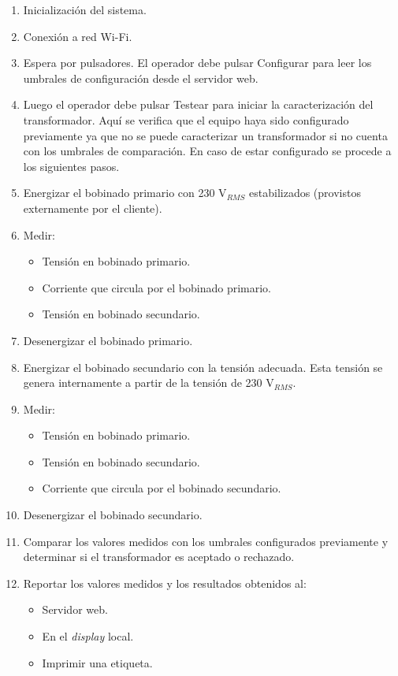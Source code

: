 \begin{enumerate}
\item Inicialización del sistema.
\item Conexión a red Wi-Fi.
\item Espera por pulsadores. El operador debe pulsar Configurar para leer los umbrales de configuración desde el servidor web.
\item Luego el operador debe pulsar Testear para iniciar la caracterización del transformador. Aquí se verifica que el equipo haya sido configurado previamente ya que no se puede caracterizar un transformador si no cuenta con los umbrales de comparación. En caso de estar configurado se procede a los siguientes pasos.
\item Energizar el bobinado primario con 230 V$_{RMS}$ estabilizados (provistos externamente por el cliente).
\item Medir:
\begin{itemize}
	\item Tensión en bobinado primario.
	\item Corriente que circula por el bobinado primario.
	\item Tensión en bobinado secundario.
\end{itemize}
\item Desenergizar el bobinado primario.
\item Energizar el bobinado secundario con la tensión adecuada. Esta tensión se genera internamente a partir de la tensión de 230 V$_{RMS}$.
\item Medir:
\begin{itemize}
	\item Tensión en bobinado primario.
	\item Tensión en bobinado secundario.
	\item Corriente que circula por el bobinado secundario.
\end{itemize}
\item Desenergizar el bobinado secundario.
\item Comparar los valores medidos con los umbrales configurados previamente y determinar si el transformador es aceptado o rechazado.
\item Reportar los valores medidos y los resultados obtenidos al:
\begin{itemize}
	\item Servidor web.
	\item En el \textit{display} local.
	\item Imprimir una etiqueta.
\end{itemize}
\end{enumerate}


